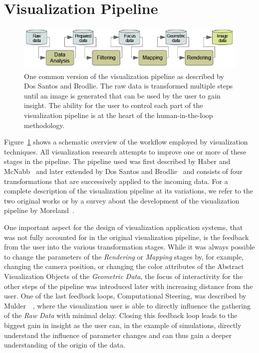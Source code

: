 \section{Visualization Pipeline} \label{cha:intro:vp}
\begin{figure}
  \centering
  \includegraphics[width=\textwidth]{figures/intro/pipeline.png}
  \caption{One common version of the visualization pipeline as described by Dos Santos and Brodlie. The raw data is transformed multiple steps until an image is generated that can be used by the user to gain insight.  The ability for the user to control each part of the visualization pipeline is at the heart of the human-in-the-loop methodology.}
  \label{fig:intro:vp}
\end{figure}

Figure~\ref{fig:intro:vp} shows a schematic overview of the workflow employed by visualization techniques.  All visualization research attempts to improve one or more of these stages in the pipeline.  The pipeline used was first described by Haber and McNabb~\cite{haber1990visualization} and later extended by Dos Santos and Brodlie~\cite{dos2004gaining} and consists of four transformations that are successively applied to the incoming data.  For a complete description of the visualization pipeline at its variations, we refer to the two original works or by a survey about the development of the visualization pipeline by Moreland~\cite{moreland2013survey}.

One important aspect for the design of visualization application systems, that was not fully accounted for in the original visualization pipeline, is the feedback from the user into the various transformation stages.  While it was always possible to change the parameters of the \emph{Rendering} or \emph{Mapping} stages by, for example, changing the camera position, or changing the color attributes of the Abstract Visualization Objects of the \emph{Geometric Data}, the focus of interactivity for the other steps of the pipeline was introduced later with increasing distance from the user.  One of the last feedback loops, Computational Steering, was described by Mulder~\etal~\cite{mulder1999survey}, where the visualization user is able to directly influence the gathering of the \emph{Raw Data} with minimal delay.  Closing this feedback loop leads to the biggest gain in insight as the user can, in the example of simulations, directly understand the influence of parameter changes and can thus gain a deeper understanding of the origin of the data.

